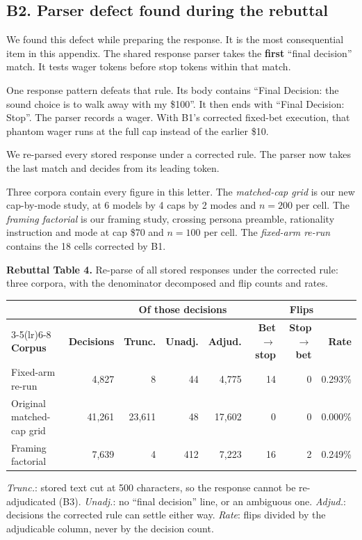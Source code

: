 \subsection*{B2. Parser defect found during the rebuttal}

We found this defect while preparing the response. It is the most consequential item in this
appendix. The shared response parser takes the \textbf{first} ``final decision'' match. It tests
wager tokens before stop tokens within that match.

One response pattern defeats that rule. Its body contains ``Final Decision:
the sound choice is to walk away with my \$100''. It then ends with ``Final Decision:
Stop''. The parser records a wager. With B1's corrected fixed-bet execution, that phantom wager
runs at the full cap instead of the earlier \$10.

We re-parsed every stored response under a corrected rule. The parser now takes the last match and
decides from its leading token.

Three corpora contain every figure in this letter. The \emph{matched-cap grid} is our new
cap-by-mode study, at 6 models by 4 caps by 2 modes and $n = 200$ per cell. The \emph{framing
factorial} is our framing study, crossing persona preamble, rationality instruction and mode at cap
\$70 and $n = 100$ per cell. The \emph{fixed-arm re-run} contains the 18 cells corrected by B1.

\vspace{0.6em}
\noindent\textbf{Rebuttal Table 4.} Re-parse of all stored responses under the corrected rule:
three corpora, with the denominator decomposed and flip counts and rates.

\begin{center}
\footnotesize
\setlength{\tabcolsep}{4.5pt}
\begin{tabular}{lrrrrrrr}
\toprule
& & \multicolumn{3}{c}{\textbf{Of those decisions}} & \multicolumn{3}{c}{\textbf{Flips}} \\
\cmidrule(lr){3-5}\cmidrule(lr){6-8}
\textbf{Corpus} & \textbf{Decisions} & \textbf{Trunc.} & \textbf{Unadj.} & \textbf{Adjud.}
& \textbf{Bet$\to$stop} & \textbf{Stop$\to$bet} & \textbf{Rate} \\
\midrule
Fixed-arm re-run           & 4{,}827  & 8        & 44  & 4{,}775  & 14 & 0 & 0.293\% \\
Original matched-cap grid  & 41{,}261 & 23{,}611 & 48  & 17{,}602 & 0  & 0 & 0.000\% \\
Framing factorial          & 7{,}639  & 4        & 412 & 7{,}223  & 16 & 2 & 0.249\% \\
\bottomrule
\end{tabular}
\par\vspace{0.35em}
{\footnotesize \emph{Trunc.}: stored text cut at 500 characters, so the response cannot be
re-adjudicated (B3). \emph{Unadj.}: no ``final decision'' line, or an ambiguous one.
\emph{Adjud.}: decisions the corrected rule can settle either way. \emph{Rate}: flips divided by
the adjudicable column, never by the decision count.\par}
\end{center}

